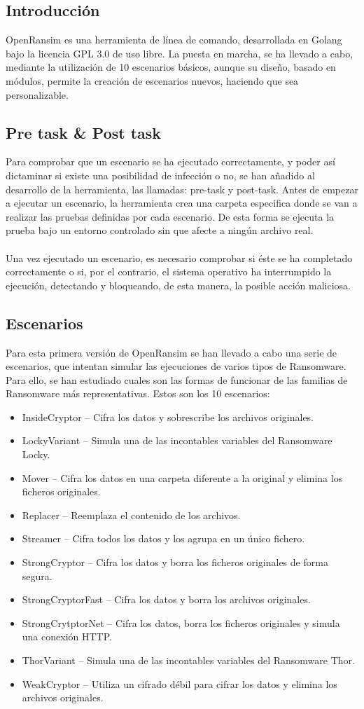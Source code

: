 \documentclass[a4paper,12pt]{article}
\begin{document}
\subsection{Introducción}
OpenRansim es una herramienta de línea de comando, desarrollada en Golang bajo la licencia GPL 3.0 de uso libre. La puesta en marcha, se ha llevado a cabo, mediante la utilización de 10 escenarios básicos, aunque su diseño, basado en módulos, permite la creación de escenarios nuevos, haciendo que sea personalizable.
\subsection{Pre task \& Post task}
Para comprobar que un escenario se ha ejecutado correctamente, y poder así dictaminar si existe una posibilidad de infección o no, se han añadido al desarrollo de la herramienta, las llamadas: pre-task y post-task. Antes de empezar a ejecutar un escenario, la herramienta crea una carpeta especifica donde se van a realizar las pruebas definidas por cada escenario. De esta forma se ejecuta la prueba bajo un entorno controlado sin que afecte a ningún archivo real.\\\\
Una vez ejecutado un escenario, es necesario comprobar si éste se ha completado correctamente o si, por el contrario, el sistema operativo ha interrumpido la ejecución, detectando y bloqueando, de esta manera, la posible acción maliciosa.  
\subsection{Escenarios}
Para esta primera versión de OpenRansim se han llevado a cabo una serie de escenarios, que intentan simular las ejecuciones de varios tipos de Ransomware. Para ello, se han estudiado cuales son las formas de funcionar de las familias de Ransomware más representativas. Estos son los 10 escenarios: 
\begin{itemize}
\item InsideCryptor – Cifra los datos y sobrescribe los archivos originales.
\item LockyVariant – Simula una de las incontables variables del Ransomware Locky.
\item Mover – Cifra los datos en una carpeta diferente a la original y elimina los ficheros originales.
\item Replacer – Reemplaza el contenido de los archivos.
\item Streamer – Cifra todos los datos y los agrupa en un único fichero.
\item StrongCryptor – Cifra los datos y borra los ficheros originales de forma segura.
\item StrongCryptorFast – Cifra los datos y borra los archivos originales.
\item StrongCrytptorNet – Cifra los datos, borra los ficheros originales y simula una conexión HTTP.
\item ThorVariant – Simula una de las incontables variables del Ransomware Thor.
\item WeakCryptor – Utiliza un cifrado débil para cifrar los datos y elimina los archivos originales.
\end{itemize}
\end{document}
